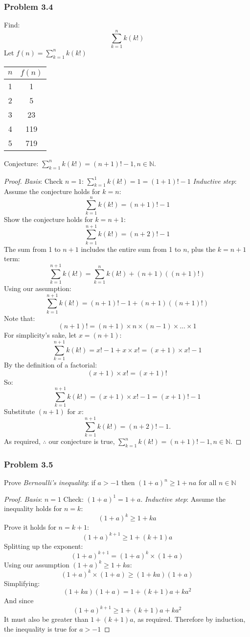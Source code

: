 \documentclass[hidelinks,12pt]{article}
\newcommand{\N}{\mathbb{N}}
\begin{document}
\subsubsection{Problem 3.4}
Find:$$\sum_{k=1}^{n}k(k!)$$
Let $f(n)=\sum_{k=1}^{n}k(k!)$
\begin{center}
    \begin{tabular}{c|c}
    $n$ & $f(n)$\\
    \hline
    1 & 1\\
    \hline
    2 & 5\\
    \hline
    3 & 23\\
    \hline
    4 & 119\\
    \hline
    5 & 719
    \end{tabular}
\end{center}
Conjecture: $\sum_{k=1}^{n}k(k!)=(n+1)!-1, n \in \N$.
\begin{proof}\emph{Basis}: Check $n=1$: $\sum_{k=1}^{1}k(k!)=1=(1+1)!-1$
\newline \emph{Inductive step}: Assume the conjecture holds for $k=n$: $$\sum_{k=1}^{n}k(k!)=(n+1)!-1$$
Show the conjecture holds for $k=n+1$: $$\sum_{k=1}^{n+1}k(k!)=(n+2)!-1$$
The sum from 1 to $n+1$ includes the entire sum from 1 to $n$, plus the $k=n+1$ term:$$\sum_{k=1}^{n+1}k(k!)=\sum_{k=1}^{n}k(k!)+(n+1)((n+1)!)$$
Using our assumption:$$\sum_{k=1}^{n+1}k(k!)=(n+1)!-1+(n+1)((n+1)!)$$
Note that:$$(n+1)!=(n+1)\times n \times(n-1)\times...\times1$$
For simplicity's sake, let $x=(n+1)$:
$$\sum_{k=1}^{n+1}k(k!)=x!-1+x\times x!=(x+1)\times x!-1$$
By the definition of a factorial:$$(x+1)\times x! = (x+1)!$$ So:$$\sum_{k=1}^{n+1}k(k!)=(x+1)\times x!-1=(x+1)!-1$$Substitute $(n+1)$ for $x$:$$\sum_{k=1}^{n+1}k(k!)=(n+2)!-1.$$
As required, $\therefore$ our conjecture is true, $\sum_{k=1}^{n}k(k!)=(n+1)!-1, n \in \N$. \end{proof}
\newpage 
\subsubsection{Problem 3.5}
Prove \emph{Bernoulli's inequality}: if $a>-1$ then $(1+a)^n \geq 1+na$ for all $n \in \N$
\begin{proof} \emph{Basis}: $n=1$ Check: $(1+a)^1=1+a$.
\newline\emph{Inductive step}: Assume the inequality holds for $n=k$: $$(1+a)^k \geq 1+ka$$
Prove it holds for $n=k+1$: $$(1+a)^{k+1}\geq 1+(k+1)a$$Splitting up the exponent:$$(1+a)^{k+1}=(1+a)^k\times(1+a)$$Using our assumption $(1+a)^k \geq 1+ka$:$$(1+a)^k\times(1+a)\geq (1+ka)(1+a)$$Simplifying:$$(1+ka)(1+a)=1+(k+1)a+ka^2$$And since $$(1+a)^{k+1}\geq 1+(k+1)a+ka^2$$It must also be greater than $1+(k+1)a$, as required. Therefore by induction, the inequality is true for $a>-1$ \end{proof}
\end{document}
